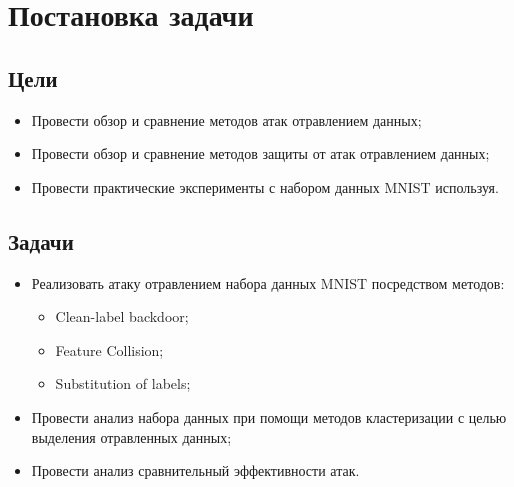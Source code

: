\section*{Постановка задачи}

\subsection*{Цели}
\begin{itemize}
    \item Провести обзор и сравнение методов атак отравлением данных;
    \item Провести обзор и сравнение методов защиты от атак отравлением данных;
    \item Провести практические эксперименты с набором данных MNIST используя.
\end{itemize}

\subsection*{Задачи}
\begin{itemize}
    \item Реализовать атаку отравлением набора данных MNIST посредством методов:
    \begin{itemize}
        \item Clean-label backdoor;
        \item Feature Collision;
        \item Substitution of labels;
    \end{itemize}
    \item Провести анализ набора данных при помощи методов кластеризации с целью выделения отравленных данных;
    \item Провести анализ сравнительный эффективности атак.
\end{itemize}
